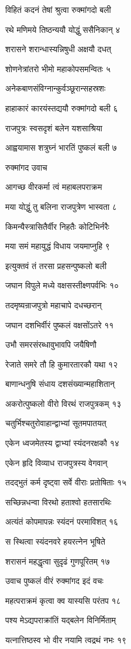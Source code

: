 विहितं कदनं तेषां श्रुत्वा रुक्मांगदो बली

रथे मणिमये तिष्ठन्ययौ योद्धुं ससैनिकान् ४

शरासने शरान्धास्यन्निषुधी अक्षयौ दधत्

शोणनेत्रांतरो भीमो महाकोपसमन्वितः ५

अनेकबाणसंविग्नान्कुर्वञ्छूरान्सहस्रशः

हाहाकारं कारयंस्तद्ययौ रुक्मांगदो बली ६

राजपुत्रः स्वसदृशं बलेन यशसाश्रिया

आह्वयामास शत्रुघ्नं भारतिं पुष्कलं बली ७

रुक्मांगद उवाच

आगच्छ वीरकर्मा त्वं महाबलपराक्रम

मया योद्धुं तु बलिना राजपुत्रेण भास्वता ८

किमन्यैस्त्रासितैर्वीर निहतैः कोटिभिर्नरैः

मया समं महायुद्धं विधाय जयमाप्नुहि ९

इत्युक्तवं तं तरसा प्रहसन्पुष्कलो बली

जघान विपुले मध्ये वक्षसस्तीक्ष्णपर्वभिः १०

तदमृष्यन्राजपुत्रो महाचापे दधच्छरान्

जघान दशभिर्वीरं पुष्कलं वक्षसोंऽतरे ११

उभौ समरसंरब्धावुभावपि जयैषिणौ

रेजाते समरे तौ हि कुमारतारकौ यथा १२

बाणान्धनुषि संधाय दशसंख्यान्महाशितान्

अकरोत्पुष्कलो वीरो विरथं राजपुत्रकम् १३

चतुर्भिश्चतुरोवाहान्द्वाभ्यां सूतमपातयत्

एकेन ध्वजमेतस्य द्वाभ्यां स्यंदनरक्षकौ १४

एकेन हृदि विव्याध राजपुत्रस्य वेगवान्

तदद्भुतं कर्म दृष्ट्वा सर्वे वीराः प्रतोषिताः १५

सच्छिन्नधन्वा विरथो हताश्वो हतसारथिः

अत्यंतं कोपमापन्नः स्यंदनं परमाविशत् १६

स स्थित्वा स्यंदनवरे हयरत्नेन भूषिते

शरासनं महद्धृत्वा सुदृढं गुणपूरितम् १७

उवाच पुष्कलं वीरं रुक्मांगद इदं वचः

महत्पराक्रमं कृत्वा क्व यास्यसि परंतप १८

पश्य मेऽद्यपराक्रांतिं यद्बलेन विनिर्मिताम्

यत्नात्तिष्ठस्व भो वीर नयामि त्वद्रथं नभः १९

